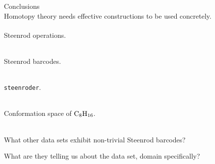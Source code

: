 
\begin{frame}{Conclusions}
	\pause
	 \\
	Homotopy theory needs effective constructions to be used concretely. \\

	\medskip\pause
	 \\
	Steenrod operations.

	\medskip\pause
	 \\
	Steenrod barcodes.

	\medskip\pause
	 \\
	\texttt{steenroder}.

	\medskip\pause
	 \\
	Conformation space of $\mathrm{C}_8\mathrm{H}_{16}$.

	\medskip\pause
	 \\
	\pause
	What other data sets exhibit non-trivial Steenrod barcodes?

	\smallskip\pause
	What are they telling us about the data set, domain specifically?
\end{frame}